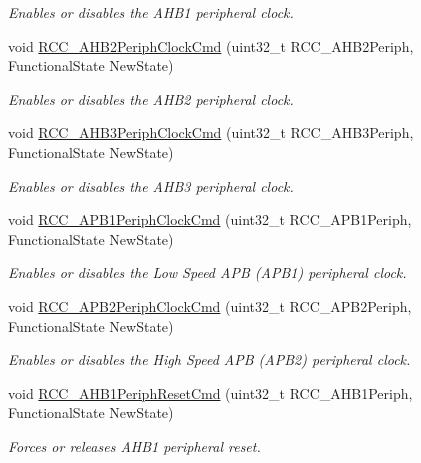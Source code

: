 \begin{DoxyCompactItemize}
\begin{DoxyCompactList}\small\item\em Enables or disables the A\-H\-B1 peripheral clock. \end{DoxyCompactList}\item 
void \hyperlink{group___r_c_c___group3_gaadffedbd87e796f01d9776b8ee01ff5e}{R\-C\-C\-\_\-\-A\-H\-B2\-Periph\-Clock\-Cmd} (uint32\-\_\-t R\-C\-C\-\_\-\-A\-H\-B2\-Periph, Functional\-State New\-State)
\begin{DoxyCompactList}\small\item\em Enables or disables the A\-H\-B2 peripheral clock. \end{DoxyCompactList}\item 
void \hyperlink{group___r_c_c___group3_ga4eb8c119f2e9bf2bd2e042d27f151338}{R\-C\-C\-\_\-\-A\-H\-B3\-Periph\-Clock\-Cmd} (uint32\-\_\-t R\-C\-C\-\_\-\-A\-H\-B3\-Periph, Functional\-State New\-State)
\begin{DoxyCompactList}\small\item\em Enables or disables the A\-H\-B3 peripheral clock. \end{DoxyCompactList}\item 
void \hyperlink{group___r_c_c___group3_gaee7cc5d73af7fe1986fceff8afd3973e}{R\-C\-C\-\_\-\-A\-P\-B1\-Periph\-Clock\-Cmd} (uint32\-\_\-t R\-C\-C\-\_\-\-A\-P\-B1\-Periph, Functional\-State New\-State)
\begin{DoxyCompactList}\small\item\em Enables or disables the Low Speed A\-P\-B (A\-P\-B1) peripheral clock. \end{DoxyCompactList}\item 
void \hyperlink{group___r_c_c___group3_ga56ff55caf8d835351916b40dd030bc87}{R\-C\-C\-\_\-\-A\-P\-B2\-Periph\-Clock\-Cmd} (uint32\-\_\-t R\-C\-C\-\_\-\-A\-P\-B2\-Periph, Functional\-State New\-State)
\begin{DoxyCompactList}\small\item\em Enables or disables the High Speed A\-P\-B (A\-P\-B2) peripheral clock. \end{DoxyCompactList}\item 
void \hyperlink{group___r_c_c___group3_gaa7c450567f4731d4f0615f63586cad86}{R\-C\-C\-\_\-\-A\-H\-B1\-Periph\-Reset\-Cmd} (uint32\-\_\-t R\-C\-C\-\_\-\-A\-H\-B1\-Periph, Functional\-State New\-State)
\begin{DoxyCompactList}\small\item\em Forces or releases A\-H\-B1 peripheral reset. \end{DoxyCompactList}\item 

\end{DoxyCompactItemize}
